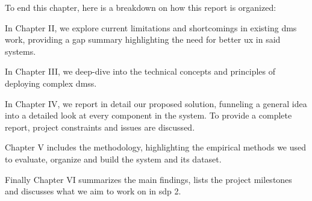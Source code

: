 To end this chapter, here is a breakdown on how this report is organized:

In Chapter II, we explore current limitations and shortcomings in existing \gls{dms} work, providing a gap summary highlighting the need for better \gls{ux} in said systems.

In Chapter III, we deep-dive into the technical concepts and principles of deploying complex \glspl{dms}.

In Chapter IV, we report in detail our proposed solution, funneling a general idea into a detailed look at every component in the system. To provide a complete report, project constraints and issues are discussed.

Chapter V includes the methodology, highlighting the empirical methods we used to evaluate, organize and build the system and its dataset.

Finally Chapter VI summarizes the main findings, lists the project milestones and discusses what we aim to work on in \gls{sdp} 2.
